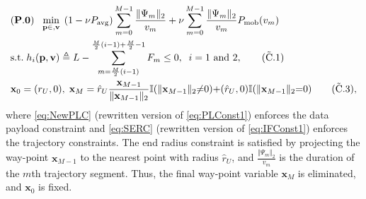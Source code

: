 \documentclass[12pt, draftcls, onecolumn]{IEEEtran}
\theoremstyle{plain}
\theoremstyle{definition}
\theoremstyle{remark}
\begin{document}
\begin{align}
    &(\mathbf{P.0})\;\;\; \underset{\mathbf p \in ,\mathbf v}{\mathrm{min}} \;\,  (1-\nu P_{\mathrm{avg}}) \sum_{m=0}^{M-1} \frac{\Vert \Psi_m \Vert_2}{v_m} + \nu \sum_{m=0}^{M-1} \frac{\Vert \Psi_m \Vert_2}{v_m} P_{\mathrm{mob}}(v_m) \label{eq:HeurMin}\\
    &\mathrm{s.t.}\; h_{i}(\mathbf p ,\mathbf v) \triangleq L - \sum_{m=\frac{M}{2}(i-1)}^{\frac{M}{2}(i-1)+\frac{M}{2}-1} F_{m} \leq 0, \;\; i = 1\text{ and }2,\label{eq:NewPLC}\tag{$\tilde{\text{C}}$.1} \\
    &\mathbf x_0 = (r_U,0), \; \mathbf x_M = 
    \hat{r}_U\frac{\mathbf{x}_{M-1}}{\Vert \mathbf x_{M-1}\Vert_2}\mathbb{I}(\Vert \mathbf x_{M-1} \Vert_2 {\neq} 0) {+} (\hat{r}_U,0)\mathbb{I}(\Vert \mathbf x_{M-1} \Vert_2 {=} 0)\label{eq:SERC}\tag{$\tilde{\text{C}}$.3},
\end{align}
where \ref{eq:NewPLC} (rewritten version of \ref{eq:PLConst1}) enforces the data payload constraint and \ref{eq:SERC} (rewritten version of \ref{eq:IFConst1}) enforces the trajectory constraints. The end radius constraint is satisfied by projecting the way-point $\mathbf{x}_{M{-}1}$ to the nearest point with radius $\hat{r}_{U}$, and $\frac{\Vert\Psi_{m}\Vert_{2}}{v_{m}}$ is the duration of the $m$th trajectory segment. Thus, the final way-point variable $\mathbf{x}_{M}$ is eliminated, and $\mathbf{x}_{0}$ is fixed.
\end{document}
